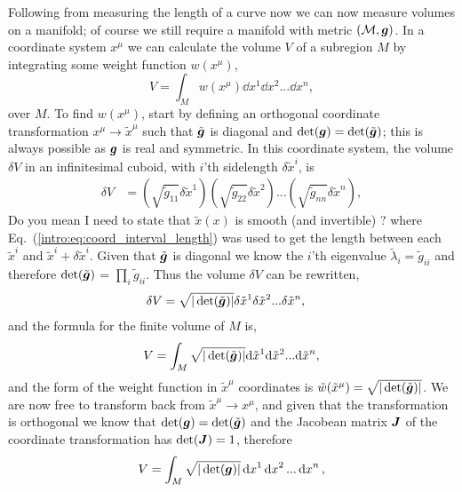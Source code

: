 Following from measuring the length of a curve now we can now measure volumes on a manifold; of course we still require a manifold with metric $(\mathcal{M},\boldsymbol{g})$. In a coordinate system $x^\mu$ we can calculate the volume $V$ of a subregion $M$ by integrating some weight function $w(x^\mu)$,
\begin{equation}
V = \int_{M} w(x^\mu) \dd x^1 \dd x^2 ... \dd x^n,
\end{equation}
over $M$. To find $w(x^\mu)$, start by defining an orthogonal coordinate transformation $x^\mu \rightarrow \tilde{x}^\mu$ such that $\tilde{\boldsymbol{g}}$ is diagonal and $\det(\boldsymbol{g})=\det(\tilde{\boldsymbol{g}})$; this is always possible as $\boldsymbol{g}$ is real and symmetric. In this coordinate system, the volume $\delta V$ in an infinitesimal cuboid, with $i$'th sidelength $\delta \tilde{x}^i$, is
\begin{align}
\delta V &=  \left( \sqrt{\tilde{g}_{11}}\delta \tilde{x}^1 \right)\left(\sqrt{\tilde{g}_{22}}\delta \tilde{x}^2 \right)... \left(\sqrt{\tilde{g}_{nn}}\delta \tilde{x}^n\right) ,
\end{align}
\color{choral} Do you mean I need to state that $\tilde{x}(x)$ is smooth (and invertible) ? \color{black}
where Eq.~(\ref{intro:eq:coord_interval_length}) was used to get the length between each $\tilde{x}^i$ and $\tilde{x}^i + \delta \tilde{x}^i$. Given that $\tilde{\boldsymbol{g}}$ is diagonal we know the $i$'th eigenvalue $\tilde{\lambda}_i = \tilde{g}_{ii}$ and therefore $\det(\tilde{\boldsymbol{g}})$ = $\prod_i \tilde{g}_{ii}$. Thus the volume $\delta V$ can be rewritten,
\begin{align}
\delta V &=  \sqrt{|\det(\tilde{\boldsymbol{g}})|}\delta \tilde{x}^1 \delta \tilde{x}^2  ... \delta \tilde{x}^n ,
\end{align}
and the formula for the finite volume of $M$ is,
\begin{equation} \label{intro:eq:volume_curved}
V = \int_{M} \sqrt{|\det(\tilde{\boldsymbol{g}})|} \dd \tilde{x}^1 \dd \tilde{x}^2 ... \dd \tilde{x}^n,
\end{equation}
and the form of the weight function in $\tilde{x}^\mu$ coordinates is $\tilde{w}(\tilde{x}^\mu)= \sqrt{|\det(\tilde{\boldsymbol{g}})|}$.
We are now free to transform back from $\tilde{x}^\mu\rightarrow x^\mu$, and given that the transformation is orthogonal we know that $\det(\boldsymbol{g})=\det(\tilde{\boldsymbol{g}})$ and the Jacobean matrix $\boldsymbol{J}$ of the coordinate transformation has $\det({\boldsymbol{J}})=1$, therefore
\begin{equation}\label{intro:eq:volume_curved2}
V = \int_{M} \sqrt{|\det({\boldsymbol{g}})|} \dd {x}^1 \dd {x}^2 ... \dd {x}^n,
\end{equation}
